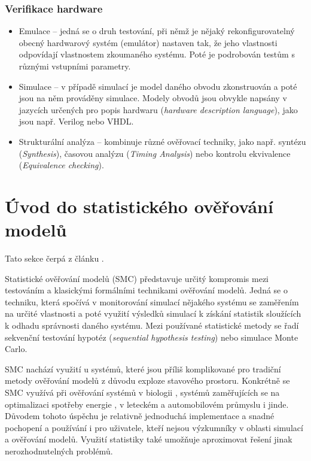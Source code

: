 \subsubsection{Verifikace hardware}
\begin{itemize}
    \item Emulace -- jedná se o druh testování, při němž je nějaký rekonfigurovatelný obecný hardwarový systém (emulátor) nastaven tak, že jeho vlastnosti odpovídají vlastnostem zkoumaného systému. Poté je podrobován testům s různými vstupními parametry.
    \item Simulace -- v případě simulací je model daného obvodu zkonstruován a poté jsou na něm prováděny simulace. Modely obvodů jsou obvykle napsány v jazycích určených pro popis hardwaru (\textit{hardware description language}), jako jsou např. Verilog nebo VHDL.
    \item Strukturální analýza -- kombinuje různé ověřovací techniky, jako např. syntézu (\textit{Synthesis}), časovou analýzu (\textit{Timing Analysis}) nebo kontrolu ekvivalence (\textit{Equivalence checking}).
\end{itemize}

\section{Úvod do statistického ověřování modelů}
Tato sekce čerpá z článku \cite{uppaal_smc}. 

Statistické ověřování modelů (SMC) představuje určitý kompromis mezi testováním a klasickými formálními technikami ověřování modelů. Jedná se o techniku, která spočívá v monitorování simulací nějakého systému se zaměřením na určité vlastnosti a poté využití výsledků simulací k získání statistik sloužících k odhadu správnosti daného systému. Mezi používané statistické metody se řadí sekvenční testování hypotéz (\textit{sequential hypothesis testing}) nebo simulace Monte Carlo.

SMC nachází využití u systémů, které jsou příliš komplikované pro tradiční metody ověřování modelů z důvodu exploze stavového prostoru. Konkrétně se SMC využívá při ověřování systémů v biologii \cite{smc_biology}, systémů zaměřujících se na optimalizaci spotřeby energie \cite{smc_energy_centric}, v leteckém a automobilovém průmyslu i jinde. Důvodem tohoto úspěchu je relativně jednoduchá implementace a snadné pochopení a používání i pro uživatele, kteří nejsou výzkumníky v oblasti simulací a ověřování modelů. Využití statistiky také umožňuje aproximovat řešení jinak nerozhodnutelných problémů.

